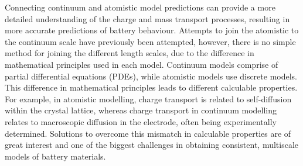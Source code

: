 \documentclass[journal=jacsat,manuscript=article]{achemso}
\begin{document}
Connecting continuum and atomistic model predictions can provide a more detailed understanding of the charge and mass transport processes, resulting in more accurate predictions of battery behaviour.
Attempts to join the atomistic to the continuum scale have previously been attempted, however, there is no simple method for joining the different length scales, due to the difference in mathematical principles used in each model.\cite{Fackeldey2015}
Continuum models comprise of partial differential equations (PDEs), while atomistic models use discrete models.\cite{Badia2007}
This difference in mathematical principles leads to different calculable properties.
For example, in atomistic modelling, charge transport is related to self-diffusion within the crystal lattice, whereas charge transport in continuum modelling relates to macroscopic diffusion in the electrode, often being experimentally determined.
Solutions to overcome this mismatch in calculable properties are of great interest and one of the biggest challenges in obtaining consistent, multiscale models of battery materials.


\end{document}
